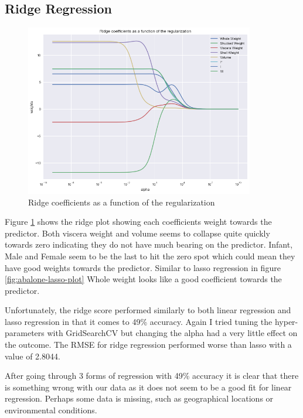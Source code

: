 \subsection{Ridge Regression}

\begin{figure}[H]
  \centering
  \includegraphics[scale=0.5,width=100mm]{./images/abalone-ridge-regression.png}
  \caption{Ridge coefficients as a function of the regularization}
  \label{fig:abalone-ridge-plot}
\end{figure}

Figure \ref{fig:abalone-ridge-plot} shows the ridge plot showing each coefficients weight towards the predictor. Both viscera weight and volume seems to collapse quite quickly towards zero indicating they do not have much bearing on the predictor. Infant, Male and Female seem to be the last to hit the zero spot which could mean they have good weights towards the predictor. Similar to lasso regression in figure \ref{fig:abalone-lasso-plot} Whole weight looks like a good coefficient towards the predictor. 

Unfortunately, the ridge score performed similarly to both linear regression and lasso regression in that it comes to 49\% accuracy. Again I tried tuning the hyper-parameters with GridSearchCV but changing the alpha had a very little effect on the outcome. The RMSE for ridge regression performed worse than lasso with a value of 2.8044.

After going through 3 forms of regression with 49\% accuracy it is clear that there is something wrong with our data as it does not seem to be a good fit for linear regression. Perhaps some data is missing, such as geographical locations or environmental conditions.
